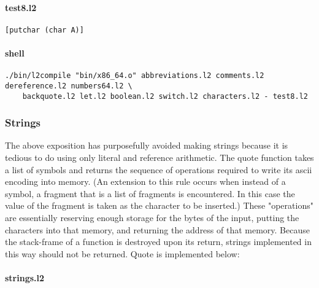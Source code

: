 \documentclass[]{article}
\let\oldparagraph\paragraph
\renewcommand{\paragraph}[1]{\oldparagraph{#1}\mbox{}}
\begin{document}
\hypertarget{test8.l2}{%
\paragraph{test8.l2}\label{test8.l2}}

\begin{verbatim}
[putchar (char A)]
\end{verbatim}

\hypertarget{shell-7}{%
\paragraph{shell}\label{shell-7}}

\begin{verbatim}
./bin/l2compile "bin/x86_64.o" abbreviations.l2 comments.l2 dereference.l2 numbers64.l2 \
    backquote.l2 let.l2 boolean.l2 switch.l2 characters.l2 - test8.l2
\end{verbatim}

\hypertarget{strings}{%
\subsubsection{Strings}\label{strings}}

The above exposition has purposefully avoided making strings because it
is tedious to do using only literal and reference arithmetic. The quote
function takes a list of symbols and returns the sequence of operations
required to write its ascii encoding into memory. (An extension to this
rule occurs when instead of a symbol, a fragment that is a list of
fragments is encountered. In this case the value of the fragment is
taken as the character to be inserted.) These "operations" are
essentially reserving enough storage for the bytes of the input, putting
the characters into that memory, and returning the address of that
memory. Because the stack-frame of a function is destroyed upon its
return, strings implemented in this way should not be returned. Quote is
implemented below:

\hypertarget{strings.l2}{%
\paragraph{strings.l2}\label{strings.l2}}
\end{document}
